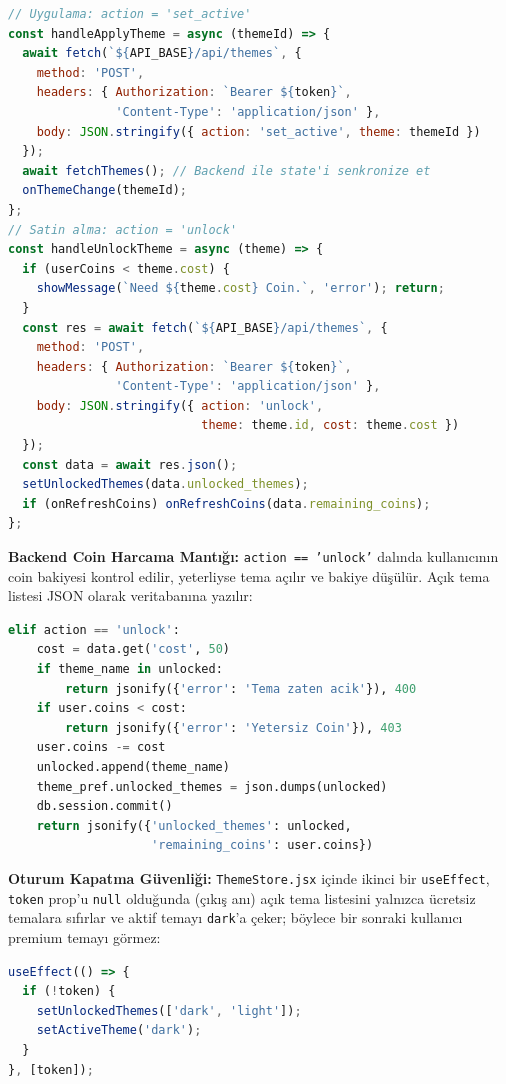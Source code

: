 \documentclass[12pt,a4paper]{article}
\begin{document}
\begin{lstlisting}[language=JavaScript, caption=ThemeStore.jsx -- Apply ve Unlock Fonksiyonları (satır 51--113)]
// Uygulama: action = 'set_active'
const handleApplyTheme = async (themeId) => {
  await fetch(`${API_BASE}/api/themes`, {
    method: 'POST',
    headers: { Authorization: `Bearer ${token}`,
               'Content-Type': 'application/json' },
    body: JSON.stringify({ action: 'set_active', theme: themeId })
  });
  await fetchThemes(); // Backend ile state'i senkronize et
  onThemeChange(themeId);
};
// Satin alma: action = 'unlock'
const handleUnlockTheme = async (theme) => {
  if (userCoins < theme.cost) {
    showMessage(`Need ${theme.cost} Coin.`, 'error'); return;
  }
  const res = await fetch(`${API_BASE}/api/themes`, {
    method: 'POST',
    headers: { Authorization: `Bearer ${token}`,
               'Content-Type': 'application/json' },
    body: JSON.stringify({ action: 'unlock',
                           theme: theme.id, cost: theme.cost })
  });
  const data = await res.json();
  setUnlockedThemes(data.unlocked_themes);
  if (onRefreshCoins) onRefreshCoins(data.remaining_coins);
};
\end{lstlisting}

\textbf{Backend Coin Harcama Mantığı:} \texttt{action == 'unlock'} dalında kullanıcının coin bakiyesi kontrol edilir, yeterliyse tema açılır ve bakiye düşülür. Açık tema listesi JSON olarak veritabanına yazılır:

\begin{lstlisting}[language=Python, caption=app.py -- Coin ile Tema Satın Alma (satır 6084--6103)]
elif action == 'unlock':
    cost = data.get('cost', 50)
    if theme_name in unlocked:
        return jsonify({'error': 'Tema zaten acik'}), 400
    if user.coins < cost:
        return jsonify({'error': 'Yetersiz Coin'}), 403
    user.coins -= cost
    unlocked.append(theme_name)
    theme_pref.unlocked_themes = json.dumps(unlocked)
    db.session.commit()
    return jsonify({'unlocked_themes': unlocked,
                    'remaining_coins': user.coins})
\end{lstlisting}

\textbf{Oturum Kapatma Güvenliği:} \texttt{ThemeStore.jsx} içinde ikinci bir \texttt{useEffect}, \texttt{token} prop'u \texttt{null} olduğunda (çıkış anı) açık tema listesini yalnızca ücretsiz temalara sıfırlar ve aktif temayı \texttt{dark}'a çeker; böylece bir sonraki kullanıcı premium temayı görmez:

\begin{lstlisting}[language=JavaScript, caption=ThemeStore.jsx -- Logout Temizliği (satır 27--32)]
useEffect(() => {
  if (!token) {
    setUnlockedThemes(['dark', 'light']);
    setActiveTheme('dark');
  }
}, [token]);
\end{lstlisting}
\end{document}
